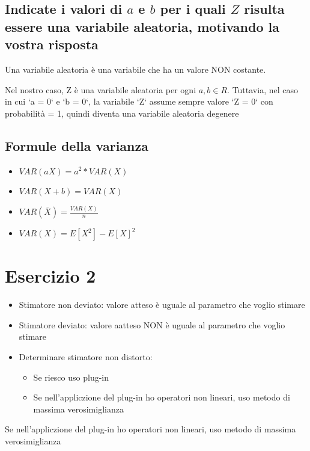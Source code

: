 \documentclass{article}
\begin{document}
\subsection*{Indicate i valori di $a$ e $b$ per i quali $Z$ risulta essere una variabile aleatoria, motivando la vostra risposta}

Una variabile aleatoria è una variabile che ha un valore NON costante.

Nel nostro caso, Z è una variabile aleatoria per ogni $a, b \in R$. Tuttavia, nel caso in cui `a = 0` e `b = 0`, la variabile `Z` assume sempre valore `Z = 0` con probabilità = 1, quindi diventa una variabile aleatoria degenere

\subsection*{Formule della varianza}

\begin{itemize}
    \item $VAR(aX) = a^2* VAR(X)$
    \item $VAR(X + b) = VAR(X)$
    \item $VAR(\overline {X}) = \frac{VAR(X)}{n}$
    \item $VAR(X) = E[X^2] - E[X]^2$
\end{itemize}

\section{Esercizio 2}

\begin{itemize}
    \item Stimatore non deviato: valore atteso è uguale al parametro che voglio stimare
    \item Stimatore deviato: valore aatteso NON è uguale al parametro che voglio stimare
    \item Determinare stimatore non distorto:
    \begin{itemize}
        \item Se riesco uso plug-in 
        \item Se nell'appliczione del plug-in ho operatori non lineari, uso metodo di massima verosimiglianza
    \end{itemize}
\end{itemize}

Se nell'appliczione del plug-in ho operatori non lineari, uso metodo di massima verosimiglianza
\end{document}
